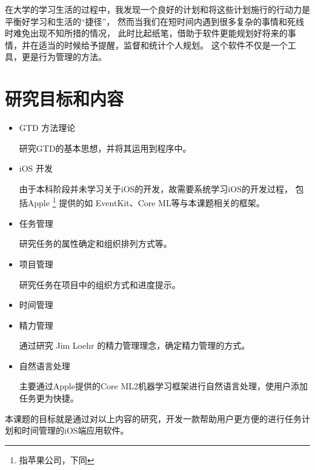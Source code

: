 在大学的学习生活的过程中，我发现一个良好的计划和将这些计划施行的行动力是平衡好学习和生活的“捷径”，
然而当我们在短时间内遇到很多复杂的事情和死线时难免出现不知所措的情况，
此时比起纸笔，借助于软件更能规划好将来的事情，并在适当的时候给予提醒，监督和统计个人规划。
这个软件不仅是一个工具，更是行为管理的方法。

\section{研究目标和内容}
\begin{itemize}
	\item GTD 方法理论
	
	研究GTD的基本思想，并将其运用到程序中。
	\item iOS 开发
	
	由于本科阶段并未学习关于iOS的开发，故需要系统学习iOS的开发过程，
	包括Apple \footnote{指苹果公司，下同} 提供的如 EventKit、Core ML等与本课题相关的框架。
	\item 任务管理
	
	研究任务的属性确定和组织排列方式等。
	\item 项目管理
	
	研究任务在项目中的组织方式和进度提示。
	\item 时间管理
	\item 精力管理
	
	通过研究 Jim Loehr 的精力管理理念，确定精力管理的方式。
	\item 自然语言处理
	
	主要通过Apple提供的Core ML2机器学习框架进行自然语言处理，使用户添加任务更为快捷。
\end{itemize}

本课题的目标就是通过对以上内容的研究，开发一款帮助用户更方便的进行任务计划和时间管理的iOS端应用软件。
